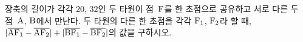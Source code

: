 장축의 길이가 각각 $20$, $32$인 두 타원이 점~$\mathrm{F}$를 한 초점으로 공유하고 서로 다른 두 점~$\mathrm{A}$, $\mathrm{B}$에서 만난다. 두 타원의 다른 한 초점을 각각 $\mathrm{F_1}$, $\mathrm{F_2}$라 할 때, $|\overline{\mathrm{AF_1}}-\overline{\mathrm{AF_2}}|+|\overline{\mathrm{BF_1}}-\overline{\mathrm{BF_2}}|$의 값을 구하시오.
